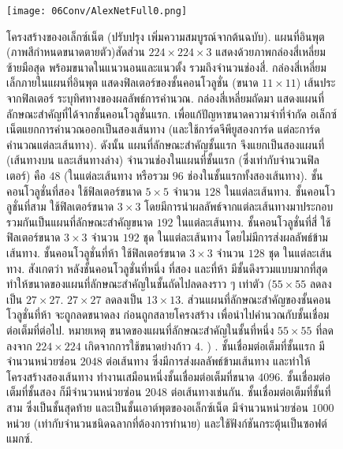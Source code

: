 %
\begin{figure}
	\begin{center}
		\texttt{[image: 06Conv/AlexNetFull0.png]}
		\caption[โครงสร้างของอเล็กซ์เน็ต]{โครงสร้างของอเล็กซ์เน็ต (ปรับปรุง เพิ่มความสมบูรณ์จากต้นฉบับ\cite{Alexnet2012}).
แผนที่อินพุต (ภาพสีกำหนดขนาดตายตัว)สัดส่วน $224 \times 224 \times 3$ แสดงด้วยภาพกล่องสี่เหลี่ยมซ้ายมือสุด พร้อมขนาดในแนวนอนและแนวตั้ง รวมถึงจำนวนช่องสี่.
กล่องสี่เหลี่ยมเล็กภายในแผนที่อินพุต
แสดงฟิลเตอร์ของชั้นคอนโวลูชั่น (ขนาด $11 \times 11$)
เส้นประจากฟิลเตอร์ ระบุทิศทางของผลลัพธ์การคำนวณ.
กล่องสี่เหลี่ยมถัดมา
แสดงแผนที่ลักษณะสำคัญที่ได้จากชั้นคอนโวลูชั่นแรก.
เพื่อแก้ปัญหาขนาดความจำที่จำกัด
อเล็กซ์เน็ตแยกการคำนวณออกเป็นสองเส้นทาง (และใช้การ์ดจีพียูสองการ์ด แต่ละการ์ดคำนวณแต่ละเส้นทาง).
ดังนั้น 
แผนที่ลักษณะสำคัญชั้นแรก จึงแยกเป็นสองแผนที่ (เส้นทางบน และเส้นทางล่าง)
จำนวนช่องในแผนที่ชั้นแรก (ซึ่งเท่ากับจำนวนฟิลเตอร์)
คือ $48$ (ในแต่ละเส้นทาง หรือรวม $96$ ช่องในชั้นแรกทั้งสองเส้นทาง).
ชั้นคอนโวลูชั่นที่สอง ใช้ฟิลเตอร์ขนาด $5 \times 5$ จำนวน $128$ ในแต่ละเส้นทาง.
ชั้นคอนโวลูชั่นที่สาม ใช้ฟิลเตอร์ขนาด $3 \times 3$ 
โดยมีการนำผลลัพธ์จากแต่ละเส้นทางมาประกอบรวมกันเป็นแผนที่ลักษณะสำคัญขนาด $192$ ในแต่ละเส้นทาง.
ชั้นคอนโวลูชั่นที่สี่ ใช้ฟิลเตอร์ขนาด $3 \times 3$ จำนวน $192$ ชุด ในแต่ละเส้นทาง
โดยไม่มีการส่งผลลัพธ์ข้ามเส้นทาง.
ชั้นคอนโวลูชั่นที่ห้า ใช้ฟิลเตอร์ขนาด $3 \times 3$ จำนวน $128$ ชุด
ในแต่ละเส้นทาง.
สังเกตว่า
หลังชั้นคอนโวลูชั่นที่หนึ่ง
ที่สอง และที่ห้า มีชั้นดึงรวมแบบมากที่สุด
ทำให้ขนาดของแผนที่ลักษณะสำคัญในชั้นถัดไปลดลงราว ๆ เท่าตัว
($55 \times 55$ ลดลงเป็น $27 \times 27$.
$27 \times 27$ ลดลงเป็น $13 \times 13$.
ส่วนแผนที่ลักษณะสำคัญของชั้นคอนโวลูชั่นที่ห้า จะถูกลดขนาดลง
ก่อนถูกสลายโครงสร้าง เพื่อนำไปคำนวณกับชั้นเชื่อมต่อเต็มที่ต่อไป.
หมายเหตุ ขนาดของแผนที่ลักษณะสำคัญในชั้นที่หนึ่ง $55 \times 55$ ที่ลดลงจาก $224 \times 224$ เกิดจากการใช้ขนาดย่างก้าว $4$.
)
.
ชั้นเชื่อมต่อเต็มที่ชั้นแรก มีจำนวนหน่วยซ่อน $2048$  ต่อเส้นทาง
ซึ่งมีการส่งผลลัพธ์ข้ามเส้นทาง
และทำให้โครงสร้างสองเส้นทาง ทำงานเสมือนหนึ่งชั้นเชื่อมต่อเต็มที่ขนาด $4096$.
ชั้นเชื่อมต่อเต็มที่ชั้นสอง ก็มีจำนวนหน่วยซ่อน $2048$  ต่อเส้นทางเช่นกัน.
ชั้นเชื่อมต่อเต็มที่ชั้นที่สาม 
ซึ่งเป็นชั้นสุดท้าย และเป็นชั้นเอาต์พุตของอเล็กซ์เน็ต
มีจำนวนหน่วยซ่อน $1000$ หน่วย
(เท่ากับจำนวนชนิดฉลากที่ต้องการทำนาย)
และใช้ฟังก์ชันกระตุ้นเป็นซอฟต์แมกซ์.
}
		\label{fig: Alexnet}
	\end{center}
\end{figure}
%





